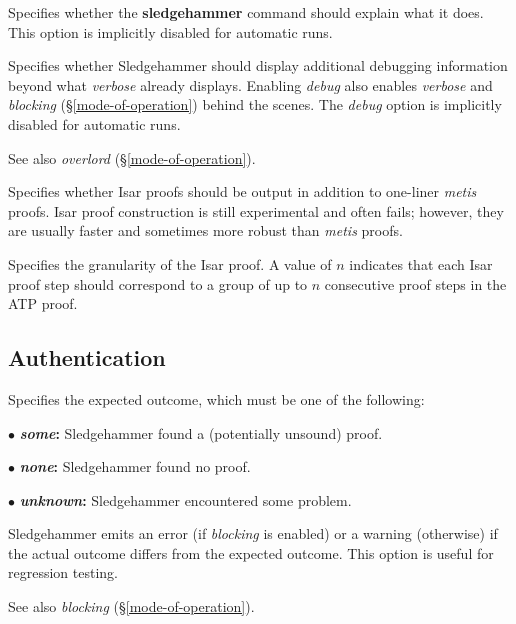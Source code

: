 \documentclass[a4paper,12pt]{article}
\begin{document}
\begin{enum}

Specifies whether the \textbf{sledgehammer} command should explain what it does.
This option is implicitly disabled for automatic runs.

Specifies whether Sledgehammer should display additional debugging information
beyond what \textit{verbose} already displays. Enabling \textit{debug} also
enables \textit{verbose} and \textit{blocking} (\S\ref{mode-of-operation})
behind the scenes. The \textit{debug} option is implicitly disabled for
automatic runs.

\nopagebreak
{\small See also \textit{overlord} (\S\ref{mode-of-operation}).}

Specifies whether Isar proofs should be output in addition to one-liner
\textit{metis} proofs. Isar proof construction is still experimental and often
fails; however, they are usually faster and sometimes more robust than
\textit{metis} proofs.

Specifies the granularity of the Isar proof. A value of $n$ indicates that each
Isar proof step should correspond to a group of up to $n$ consecutive proof
steps in the ATP proof.

\end{enum}

\subsection{Authentication}
\label{authentication}

\begin{enum}
Specifies the expected outcome, which must be one of the following:

\begin{enum}
\item[$\bullet$] \textbf{\textit{some}:} Sledgehammer found a (potentially
unsound) proof.
\item[$\bullet$] \textbf{\textit{none}:} Sledgehammer found no proof.
\item[$\bullet$] \textbf{\textit{unknown}:} Sledgehammer encountered some
problem.
\end{enum}

Sledgehammer emits an error (if \textit{blocking} is enabled) or a warning
(otherwise) if the actual outcome differs from the expected outcome. This option
is useful for regression testing.

\nopagebreak
{\small See also \textit{blocking} (\S\ref{mode-of-operation}).}
\end{enum}

\let\em=\sl
{}

\end{document}
